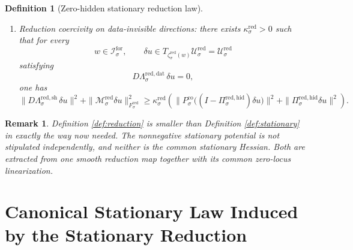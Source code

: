 \documentclass[11pt]{article}
\newcommand{\ForSpace}[1]{\mathcal I_{#1}^{\mathrm{for}}}
\newcommand{\Kernel}[1]{K_{#1}^{0}}
\newcommand{\StateComp}[1]{P_{#1}^{\mathrm{co}}}
\newcommand{\RedSpace}[1]{\mathcal U_{#1}^{\mathrm{red}}}
\newcommand{\RedData}[1]{\Lambda_{#1}^{\mathrm{red,dat}}}
\newcommand{\RedShell}[1]{\Lambda_{#1}^{\mathrm{red,sh}}}
\newcommand{\RedTarget}[1]{F_{#1}^{\mathrm{red}}}
\newcommand{\RedZero}[1]{V_{#1}^{\mathrm{red},0}}
\newcommand{\RedProj}[1]{\Pi_{#1}^{\mathrm{red,hid}}}
\newcommand{\RedLin}[1]{\mathcal M_{#1}^{\mathrm{red}}}
\newcommand{\RedEmbed}[1]{\zeta_{#1}^{\mathrm{red}}}
\newtheorem{definition}{Definition}
\newtheorem{remark}{Remark}
\begin{document}
\begin{definition}[Zero-hidden stationary reduction law]
\begin{enumerate}
    \[
    \Kernel{\sigma}
    \equiv
    \ker\bigl(D\RedData{\sigma}\big|_{\RedZero{\sigma}}\bigr)
    \cap
    \ker\bigl(D\RedShell{\sigma}\big|_{\RedZero{\sigma}}\bigr)
    \]
    and the orthogonal projector
    \[
    \StateComp{\sigma}:
    \RedZero{\sigma}\to
    {\Kernel{\sigma}}^{\perp}\cap\RedZero{\sigma}.
    \]
    \item Reduction coercivity on data-invisible directions: there exists \(\kappa_{\sigma}^{\mathrm{red}}>0\) such that for every
    \[
    w\in\ForSpace{\sigma},
    \qquad
    \delta u\in T_{\RedEmbed{\sigma}(w)}\RedSpace{\sigma}=\RedSpace{\sigma}
    \]
    satisfying
    \[
    D\RedData{\sigma}\,\delta u=0,
    \]
    one has
    \begin{equation}
    \|D\RedShell{\sigma}\,\delta u\|^{2}
    +
    \|\RedLin{\sigma}\delta u\|_{\RedTarget{\sigma}}^{2}
    \ge
    \kappa_{\sigma}^{\mathrm{red}}
    \left(
    \|\StateComp{\sigma}\bigl((I-\RedProj{\sigma})\delta u\bigr)\|^{2}
    +
    \|\RedProj{\sigma}\delta u\|^{2}
    \right).
    \label{eq:redcoercive}
    \end{equation}
\end{enumerate}
\end{definition}

\begin{remark}
Definition \ref{def:reduction} is smaller than Definition \ref{def:stationary} in exactly the way now needed. The nonnegative stationary potential is not stipulated independently, and neither is the common stationary Hessian. Both are extracted from one smooth reduction map together with its common zero-locus linearization.
\end{remark}

\section{Canonical Stationary Law Induced by the Stationary Reduction}
\end{document}
